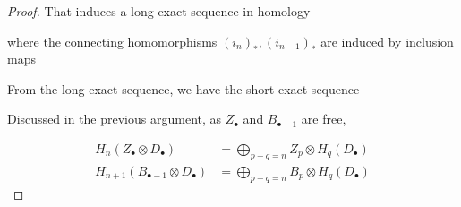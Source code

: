 \documentclass{article}
\begin{document}
\begin{proof}
    That induces a long exact sequence in homology
    \begin{center}
    \end{center}

    where the connecting homomorphisms $(i_n)_*, (i_{n-1})_*$ are induced by inclusion maps

    \begin{center}
    \end{center}

    From the long exact sequence, we have the short exact sequence
    \begin{center}
    \end{center}

    Discussed in the previous argument, as $Z_\bullet$ and $B_{\bullet-1}$ are free,

    \begin{align*}
        H_n(Z_\bullet \otimes D_\bullet) &= \bigoplus_{p + q = n} Z_p \otimes H_q(D_\bullet) \\
        H_{n+1}(B_{\bullet-1} \otimes D_\bullet) &= \bigoplus_{p + q = n} B_p \otimes H_q(D_\bullet)
    \end{align*}


\end{proof}
\end{document}

